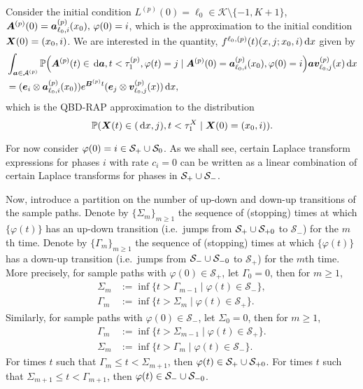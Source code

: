 Consider the initial condition \(L^{(p)}(0)=\ell_0\in\mathcal K\setminus \{-1,K+1\}\), \(\boldsymbol A^{(p)}(0)=\boldsymbol a^{(p)}_{\ell_0,i}(x_0),\,\varphi(0)=i\), which is the approximation to the initial condition \(\boldsymbol X(0)=(x_0,i)\). We are interested in the quantity, \(f^{\ell_0,(p)}(t)(x,j;x_0,i)\, \mathrm{d} x\) given by
\begin{align}
	&\int_{\boldsymbol a \in \mathcal A^{(p)}}\mathbb P\Big(\boldsymbol A^{(p)}(t)\in \, \mathrm{d} \boldsymbol a, t<\tau_1^{(p)}, \varphi(t) = j \nonumber
	\mid \boldsymbol A^{(p)}(0) = \boldsymbol   a_{\ell_0,i}^{(p)}(x_0), \varphi(0) = i\Big)
	\boldsymbol a{\boldsymbol v}_{\ell_0,j}^{(p)}(x)\, \mathrm{d} x \nonumber 
	\\&= (\boldsymbol e_i\otimes \boldsymbol  a_{\ell_0,i}^{(p)}(x_0)) e^{\boldsymbol{B}^{(p)}t}(\boldsymbol e_j \otimes {\boldsymbol v}_{\ell_0,j}^{(p)}( x))\, \mathrm{d} x, \label{eqn: ldll}
\end{align}
which is the QBD-RAP approximation to the distribution 
\[\mathbb P(\boldsymbol X(t)\in (\, \mathrm{d} x,j), t<\tau_1^X \mid \boldsymbol X(0) = (x_0, i)).\]

For now consider \(\varphi(0)=i\in\mathcal{S}_+\cup\mathcal{S}_0\). As we shall see, certain Laplace transform expressions for phases \(i\) with rate \(c_i=0\) can be written as a linear combination of certain Laplace transforms for phases in \(\mathcal{S}_+\cup\mathcal{S}_-\). 

Now, introduce a partition on the number of up-down and down-up transitions of the sample paths. Denote by \(\{\Sigma_m\}_{m\geq 1}\) the sequence of (stopping) times at which \(\{\varphi(t)\}\) has an up-down transition (i.e.~jumps from \(\mathcal S_+\cup\mathcal{S}_{+0}\) to \(\mathcal S_- \)) for the \(m\)th time. Denote by \(\{\Gamma_m\}_{m\geq 1}\) the sequence of (stopping) times at which \(\{\varphi(t)\}\) has a down-up transition (i.e.~jumps from \(\mathcal S_-\cup\mathcal{S}_{-0}\) to \(\mathcal S_+\)) for the \(m\)th time. More precisely, for sample paths with \(\varphi(0)\in\mathcal S_+\), let \(\Gamma_0=0\), then for \(m\geq 1\), 
\begin{align}
	\Sigma_m &:=\inf\{t > \Gamma_{m-1} \mid \varphi(t)\in\mathcal S_-\}, 
	\\ \Gamma_m &:=\inf\{t > \Sigma_{m} \mid \varphi(t)\in\mathcal S_+\}.
\end{align}
Similarly, for sample paths with \(\varphi(0)\in\mathcal S_-\), let \(\Sigma_0=0\), then for \(m\geq 1\), 
\begin{align}
	\Gamma_m &:=\inf\{t > \Sigma_{m-1} \mid \varphi(t)\in\mathcal S_+\}.
	\\\Sigma_m &:=\inf\{t > \Gamma_{m} \mid \varphi(t)\in\mathcal S_-\}.
\end{align}
For times \(t\) such that \(\Gamma_m\leq t<\Sigma_{m+1}\), then \(\varphi(t)\in\mathcal S_+\cup\mathcal{S}_{+0}\). For times \(t\) such that \(\Sigma_{m+1}\leq t< \Gamma_{m+1}\), then \(\varphi(t)\in\mathcal S_-\cup\mathcal{S}_{-0}\).


